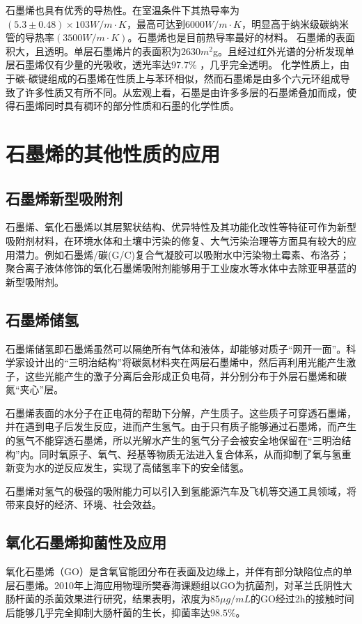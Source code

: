 石墨烯也具有优秀的导热性。在室温条件下其热导率为$(5.3±0.48)×103 W/m \cdot K$，最高可达到$6000 W/m \cdot K$\cite{RN44}，明显高于纳米级碳纳米管的导热率$(3500  W/m \cdot K)$。石墨烯也是目前热导率最好的材料。
石墨烯的表面积大，且透明。单层石墨烯片的表面积为$2630m^{2}$g。且经过红外光谱的分析发现单层石墨烯仅有少量的光吸收，透光率达$97.7\%$ \cite{RN45,RN46}，几乎完全透明。
化学性质上，由于碳-碳键组成的石墨烯在性质上与苯环相似，然而石墨烯是由多个六元环组成导致了许多性质又有所不同。从宏观上看，石墨是由许多多层的石墨烯叠加而成，使得石墨烯同时具有稠环的部分性质和石墨的化学性质。


\section{石墨烯的其他性质的应用}
\subsection{石墨烯新型吸附剂}
石墨烯、氧化石墨烯以其层絮状结构、优异特性及其功能化改性等特征可作为新型吸附剂材料，在环境水体和土壤中污染的修复、大气污染治理等方面具有较大的应用潜力。例如石墨烯/碳(G/C)复合气凝胶可以吸附水中污染物土霉素、布洛芬；\cite{lee2008measurement}聚合离子液体修饰的氧化石墨烯吸附剂能够用于工业废水等水体中去除亚甲基蓝的新型吸附剂\cite{lilulu}。

\subsection{石墨烯储氢}
石墨烯储氢即石墨烯虽然可以隔绝所有气体和液体，却能够对质子“网开一面”。科学家设计出的“三明治结构”将碳氮材料夹在两层石墨烯中，然后再利用光能产生激子，这些光能产生的激子分离后会形成正负电荷，并分别分布于外层石墨烯和碳氮“夹心”层。

石墨烯表面的水分子在正电荷的帮助下分解，产生质子。这些质子可穿透石墨烯，并在遇到电子后发生反应，进而产生氢气。由于只有质子能够通过石墨烯，而产生的氢气不能穿透石墨烯，所以光解水产生的氢气分子会被安全地保留在“三明治结构”内。同时氧原子、氧气、羟基等物质无法进入复合体系，从而抑制了氧与氢重新变为水的逆反应发生，实现了高储氢率下的安全储氢。

石墨烯对氢气的极强的吸附能力可以引入到氢能源汽车及飞机等交通工具领域，将带来良好的经济、环境、社会效益。

\subsection{氧化石墨烯抑菌性及应用}
氧化石墨烯（GO）是含氧官能团分布在表面及边缘上，并伴有部分缺陷位点的单层石墨烯。2010年上海应用物理所樊春海课题组以GO为抗菌剂，对革兰氏阴性大肠杆菌的杀菌效果进行研究，结果表明，浓度为$85\mu g/mL$的GO经过2h的接触时间后能够几乎完全抑制大肠杆菌的生长，抑菌率达$98.5\%$。\cite{pannengyu}

